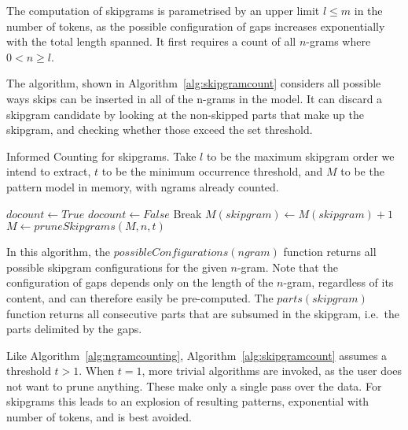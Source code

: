 \documentclass[a4paper,12pt]{article}
\begin{document}
The computation of skipgrams is parametrised by an upper limit $l\leq m$ in the number of
tokens, as the possible configuration of gaps increases exponentially with the
total length spanned. It first requires a count of all $n$-grams where $0<n\geq l$. 

The algorithm, shown in Algorithm~\ref{alg:skipgramcount} considers all
possible ways skips can be inserted in all of the n-grams in the model. It can
discard a skipgram candidate by looking at the non-skipped parts that make up the
skipgram, and checking whether those exceed the set threshold. 

\begin{algorithm} \caption{Informed Counting for skipgrams.  Take $l$
to be the maximum skipgram order we intend to extract, $t$ to be the minimum occurrence threshold, and $M$ to be the
pattern model in memory, with ngrams already counted.}
\label{alg:skipgramcount}
\begin{algorithmic}
            \State $docount \leftarrow True$
                    \State $docount \leftarrow False$
                    Break
                \EndIf
            \EndFor 
                \State $M(skipgram) \leftarrow M(skipgram) + 1$
            \EndIf
            \EndFor 
            \EndFor
    \State $M \leftarrow pruneSkipgrams(M,n,t)$
\EndFor \\
\end{algorithmic}
\end{algorithm}

In this algorithm, the $possibleConfigurations(ngram)$ function returns
all possible skipgram configurations for the given $n$-gram. Note that
the configuration of gaps depends only on the length of the $n$-gram, regardless
of its content, and can therefore easily be pre-computed. The
$parts(skipgram)$ function returns all consecutive parts that are
subsumed in the skipgram, i.e.\ the parts delimited by the gaps.

Like Algorithm~\ref{alg:ngramcounting}, Algorithm~\ref{alg:skipgramcount}
assumes a threshold $t>1$. When $t=1$, more trivial algorithms are
invoked, as the user does not want to prune anything. These make only a single
pass over the data. For skipgrams this leads to an explosion of
resulting patterns, exponential with number of tokens, and is best avoided.
\end{document}
